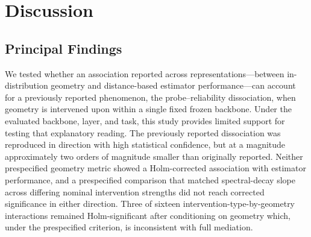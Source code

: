 %
%
%
%

\section{Discussion}

\subsection{Principal Findings}

We tested whether an association reported across representations---between
in-distribution geometry and distance-based estimator performance---can
account for a previously reported phenomenon, the probe--reliability
dissociation, when geometry is intervened upon within a single fixed frozen
backbone. Under the evaluated backbone, layer, and task, this study provides
limited support for testing that explanatory reading. The previously reported
dissociation was reproduced in direction with high statistical confidence,
but at a magnitude approximately two orders of magnitude smaller than
originally reported. Neither prespecified geometry metric showed a
Holm-corrected association with estimator performance, and a prespecified
comparison that matched spectral-decay slope across differing nominal
intervention strengths did not reach corrected significance in either
direction. Three of sixteen intervention-type-by-geometry interactions
remained Holm-significant after conditioning on geometry which, under the
prespecified criterion, is inconsistent with full mediation.

